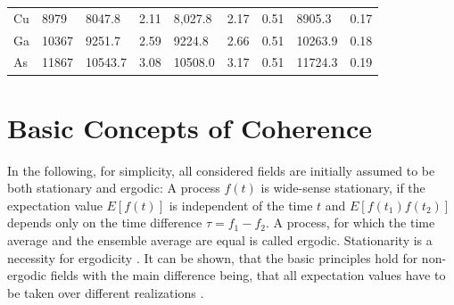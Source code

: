 \begin{table}
\begin{tabular}{l|l|ll|lll|ll}
		Cu      & 8979                                                   & 8047.8                                                & 2.11                                                 & 8,027.8                                                & 2.17                                                 & 0.51                                                      & 8905.3                                                & 0.17                                                      \\
		Ga      & 10367                                                  & 9251.7                                                 & 2.59                                                 & 9224.8                                                 & 2.66                                                 & 0.51                                                      & 10263.9                                               & 0.18                                                      \\
		As      & 11867                                                  & 10543.7                                                & 3.08                                                 & 10508.0                                                & 3.17                                                 & 0.51                                                      & 11724.3                                               & 0.19                                                      \\ \hline
	\end{tabular}
\end{table}

\section{Basic Concepts of Coherence}
In the following, for simplicity, all considered fields are initially assumed to be both stationary and ergodic: A process $f(t)$ is wide-sense stationary, if the expectation value $E[f(t)]$ is independent of the time $t$ and $E[f(t_1)f(t_2)]$ depends only on the time difference $\tau=f_1-f_2$. A process, for which the time average and the ensemble average are equal is called ergodic. Stationarity is a necessity for ergodicity \cite{goodman2000}. It can be shown, that the basic principles hold for non-ergodic fields with the main difference being, that all expectation values have to be taken over different realizations  \cite{lajunen04}.

